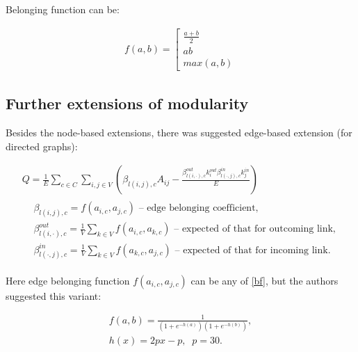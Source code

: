 \documentclass[a4paper,twocolumn]{article}
\begin{document}
Belonging function can be:

\begin{equation}
\label{bf}
\begin{aligned}
f(a, b)=\left [
\begin{matrix}
\frac{a+b}{2}
\\ 
ab
\\
max(a,b)
\end{matrix}\right.
\end{aligned}
\end{equation}

\subsection{Further extensions of modularity}

Besides the node-based extensions, there was suggested edge-based extension \cite{Nicosia2008} (for directed graphs):

\begin{strip}
\begin{equation}
\label{modularity_over_edge}
\begin{gathered}
Q=\frac{1}{E}\sum_{c\in C}\sum_{i,j\in V}\left ( \beta_{l(i,j),c}A_{ij} - \frac{\beta_{l(i,\cdot),c}^{out}k_i^{out} \beta_{l(\cdot,j),c}^{in}k_j^{in}}{E} \right )
\\
\begin{aligned}
& \beta_{l(i,j),c} = f(a_{i,c},a_{j,c}) \text{ -- edge belonging coefficient,}
\\
& \beta_{l(i,\cdot),c}^{out} = \frac{1}{V}\sum_{k \in V}{f(a_{i,c},a_{k,c})} \text{ -- expected of that for outcoming link,}
\\
& \beta_{l(\cdot,j),c}^{in} = \frac{1}{V}\sum_{k \in V}{f(a_{k,c},a_{j,c})} \text{ -- expected of that for incoming link.}
\end{aligned}
\end{gathered}
\end{equation}
\end{strip}

Here edge belonging function $f(a_{i,c},a_{j,c})$ can be any of \eqref{bf}, but the authors suggested this variant:

\begin{equation}
\label{bf_edge}
\begin{gathered}
f(a,b)=\frac{1}{(1+e^{-h(a)})(1+e^{-h(b)})},
\\
h(x)=2px-p, \;\; p=30.
\end{gathered}
\end{equation}
\end{document}
